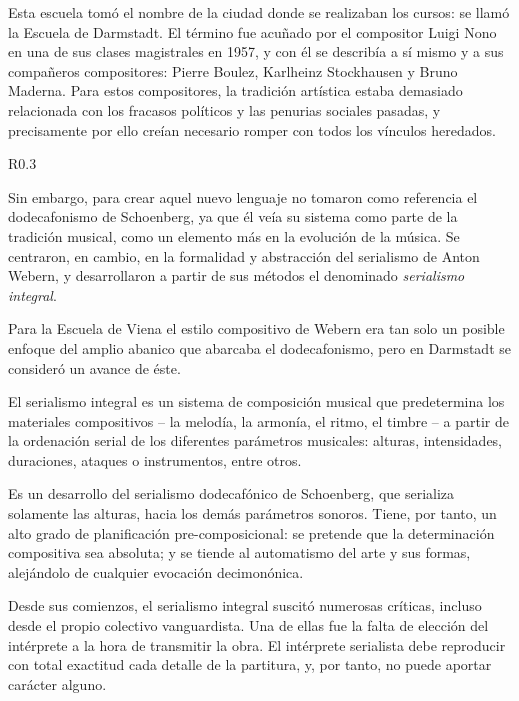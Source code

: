 	Esta escuela tomó el nombre de la ciudad donde se realizaban los cursos: se llamó la Escuela de Darmstadt. El término fue acuñado por el compositor Luigi Nono en una de sus clases magistrales en 1957, y con él se describía a sí mismo y a sus compañeros compositores: Pierre Boulez, Karlheinz Stockhausen y Bruno Maderna. Para estos compositores, la tradición artística estaba demasiado relacionada con los fracasos políticos y las penurias sociales pasadas, y precisamente por ello creían necesario romper con todos los vínculos heredados.
	
	\begin{wrapfigure}{R}{0.3\textwidth}
		\captionsetup{justification=centering, font=footnotesize}
	\end{wrapfigure}
    Sin embargo, para crear aquel nuevo lenguaje no tomaron como referencia el dodecafonismo de Schoenberg, ya que él veía su sistema como parte de la tradición musical, como un elemento más en la evolución de la música. Se centraron, en cambio, en la formalidad y abstracción del serialismo de Anton Webern, y desarrollaron a partir de sus métodos el denominado \emph{serialismo integral}.
    
    Para la Escuela de Viena el estilo compositivo de Webern era tan solo un posible enfoque del amplio abanico que abarcaba el dodecafonismo, pero en Darmstadt se consideró un avance de éste.
	
	El serialismo integral es un sistema de composición musical que predetermina los materiales compositivos -- la melodía, la armonía, el ritmo, el timbre -- a partir de la ordenación serial de los diferentes parámetros musicales: alturas, intensidades, duraciones, ataques o instrumentos, entre otros. 
	
	Es un desarrollo del serialismo dodecafónico de Schoenberg, que serializa solamente las alturas, hacia los demás parámetros sonoros. Tiene, por tanto, un alto grado de planificación pre-composicional: se pretende que la determinación compositiva sea absoluta; y se tiende al automatismo del arte y sus formas, alejándolo de cualquier evocación decimonónica.

	Desde sus comienzos, el serialismo integral suscitó numerosas críticas, incluso desde el propio colectivo vanguardista. Una de ellas fue la falta de elección del intérprete a la hora de transmitir la obra. El intérprete serialista debe reproducir con total exactitud cada detalle de la partitura, y, por tanto, no puede aportar carácter alguno. 
	
